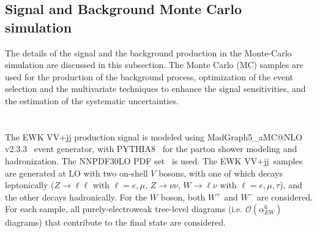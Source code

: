 \subsection{Signal and Background Monte Carlo simulation}
\label{subsec:sigbgMC}
The details of the signal and the background production in the Monte-Carlo simulation are discussed in this subsection.
The Monte Carlo (MC) samples are used for the production of the background process, optimization of the event selection and the multivariate techniques to enhance the signal sensitivities, and the estimation of the systematic uncertainties.
\\ \\
\noindent\textbf{} \\ 
The EWK VV+jj production signal is modeled using MadGraph5\_aMC@NLO v2.3.3~\cite{Alwall:2014hca} event generator, with PYTHIA8~\cite{Sjostrand:2007gs} for the parton shower modeling and hadronization. The \textsc{NNPDF30LO} PDF set~\cite{Ball:2012cx} is used. 
The EWK VV+jj\ samples are generated at LO with two on-shell $V$ bosons, with one of which decays leptonically
($Z\to \ell\ell$ with $\ell = e, \mu$, $Z\to \nu\nu$, $W\to \ell \nu$ with $\ell= e, \mu, \tau$),
and the other decays hadronically. For the $W$ boson, both $W^{+}$ and $W^{-}$ are considered.
For each sample, all purely-electroweak tree-level diagrams (i.e. $\mathcal{O}(\alpha_{EW}^6)$ diagrams) that contribute to the final state are considered.



